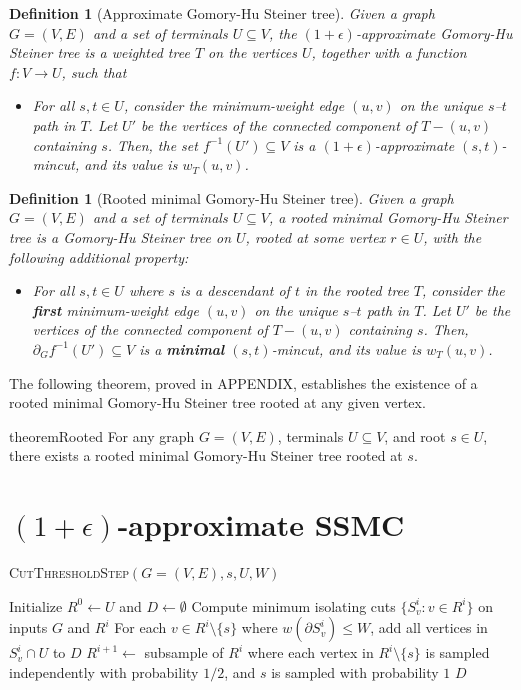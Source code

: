 \documentclass{article}
\newcommand{\sm}{\setminus}
\newcommand{\s}{\subseteq}
\newcommand{\im}{\item}
\newcommand{\BI}{\begin{itemize}}
\newcommand{\EI}{\end{itemize}}
\newcommand{\inv}{^{-1}}
\newcommand{\e}{\epsilon}
\newcommand{\pt}{\partial}
\newcommand{\lf}{\lfloor}
\newcommand{\rf}{\rfloor}
\newcommand{\1}{\mathbbm 1}
\newtheorem{definition}[theorem]{Definition}
\newcommand{\BD}{\begin{definition}}
\newcommand{\ED}{\end{definition}}
\newcommand{\thml}[1]{\label{thm:#1}}
\newcommand{\linel}[1]{\label{line:#1}}
\renewcommand{\emph}[1]{\textbf{\textup{#1}}}
\begin{document}
\BD[Approximate Gomory-Hu Steiner tree]
Given a graph $G=(V,E)$ and a set of terminals $U\s V$, the $(1+\e)$-approximate Gomory-Hu Steiner tree is a weighted tree $T$ on the vertices $U$, together with a function $f:V\to U$, such that
 \BI
 \im For all $s,t\in U$, consider the minimum-weight edge $(u,v)$ on the unique $s$--$t$ path in $T$. Let $U'$ be the vertices of the connected component of $T-(u,v)$ containing $s$.
Then, the set $f\inv(U')\s V$ is a $(1+\e)$-approximate $(s,t)$-mincut, and its value is $w_T(u,v)$.
 \EI
\ED

\BD[Rooted minimal Gomory-Hu Steiner tree]
Given a graph $G=(V,E)$ and a set of terminals $U\s V$, a rooted minimal Gomory-Hu Steiner tree is a Gomory-Hu Steiner tree on $U$, rooted at some vertex $r\in U$, with the following additional property:
 \BI
 \im[$(*)$] For all $s,t\in U$ where $s$ is a descendant of $t$ in the rooted tree $T$, consider the \emph{first} minimum-weight edge $(u,v)$ on the unique $s$--$t$ path in $T$. Let $U'$ be the vertices of the connected component of $T-(u,v)$ containing $s$.
Then, $\pt_Gf\inv(U')\s V$ is a \emph{minimal} $(s,t)$-mincut, and its value is $w_T(u,v)$.
 \EI
\ED

The following theorem, proved in APPENDIX, establishes the existence of a rooted minimal Gomory-Hu Steiner tree rooted at any given vertex.

\begin{restatable}{theorem}{Rooted}\thml{rooted}
For any graph $G=(V,E)$, terminals $U\s V$, and root $s\in U$, there exists a rooted minimal Gomory-Hu Steiner tree rooted at $s$.
\end{restatable}


\section{$(1+\e)$-approximate SSMC}


\begin{algorithm}
\caption{\textsc{CutThresholdStep}$(G=(V,E),s,U,W)$} 
\begin{algorithmic}[1]
\State Initialize $R^0\gets U$ and $D\gets\emptyset$
\For{$i$ from $0$ to $\lf\lg|U|\rf$}
 \State Compute minimum isolating cuts $\{S^i_v:v\in R^i\}$ on inputs $G$ and $R^i$ \linel{Sv}
 \State For each $v\in R^i\sm \{s\}$ where $w(\pt S^i_v)\le W$, add all vertices in $S^i_v\cap U$ to $D$
 \State $R^{i+1}\gets$ subsample of $R^i$ where each vertex in $R^i\sm \{s\}$ is sampled independently with probability $1/2$, and $s$ is sampled with probability $1$
\EndFor
\State\Return $D$
\end{algorithmic}
\end{algorithm}
\end{document}
